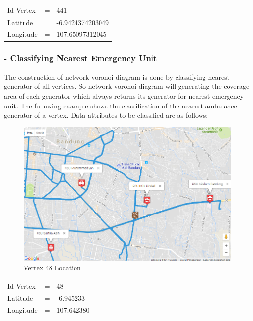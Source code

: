 \begin{table}[H]
\centering
\begin{tabular}{lcl}
Id Vertex & =                     & 441              \\
Latitude  & =                     & -6.9424374203049 \\
Longitude & \multicolumn{1}{l}{=} & 107.65097312045 
\end{tabular}
\end{table}

\pagebreak

\subsubsection{- Classifying Nearest Emergency Unit}
The construction of network voronoi diagram is done by classifying nearest generator of all vertices. So network voronoi diagram will generating the coverage area of each generator which always returns its generator for nearest emergency unit. The following example shows the classification of the nearest ambulance generator of a vertex. Data attributes to be classified are as follows:

\begin{figure}[H]
    \centering
    \includegraphics[scale=0.55]{data_proc_nvd_construction_1.png}
    \caption{Vertex 48 Location}
    \label{fig:rsu_border_point}
\end{figure}

\begin{table}[H]
\centering
\begin{tabular}{lll}
Id Vertex & = & 48 \\
Latitude & = & -6.945233 \\
Longitude & = & 107.642380 \\
\end{tabular}
\end{table}

